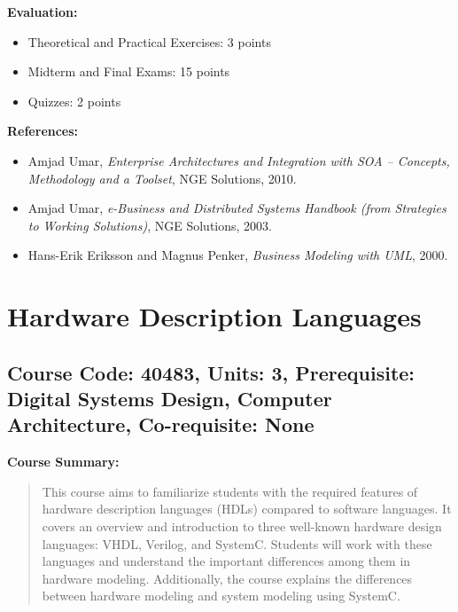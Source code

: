 \documentclass[12pt]{article}
\begin{document}
\textbf{Evaluation:}
\begin{itemize}
    \item Theoretical and Practical Exercises: 3 points
    \item Midterm and Final Exams: 15 points
    \item Quizzes: 2 points
\end{itemize}

\textbf{References:}
\begin{itemize}
    \item Amjad Umar, \textit{Enterprise Architectures and Integration with SOA – Concepts, Methodology and a Toolset}, NGE Solutions, 2010.
    \item Amjad Umar, \textit{e-Business and Distributed Systems Handbook (from Strategies to Working Solutions)}, NGE Solutions, 2003.
    \item Hans-Erik Eriksson and Magnus Penker, \textit{Business Modeling with UML}, 2000.
\end{itemize}

\newpage

\section{Hardware Description Languages}
\subsection*{Course Code: 40483, Units: 3, Prerequisite: Digital Systems Design, Computer Architecture, Co-requisite: None}

\textbf{Course Summary:} 
\begin{quote}
   This course aims to familiarize students with the required features of hardware description languages (HDLs) compared to software languages. It covers an overview and introduction to three well-known hardware design languages: VHDL, Verilog, and SystemC. Students will work with these languages and understand the important differences among them in hardware modeling. Additionally, the course explains the differences between hardware modeling and system modeling using SystemC.
\end{quote}
\end{document}
